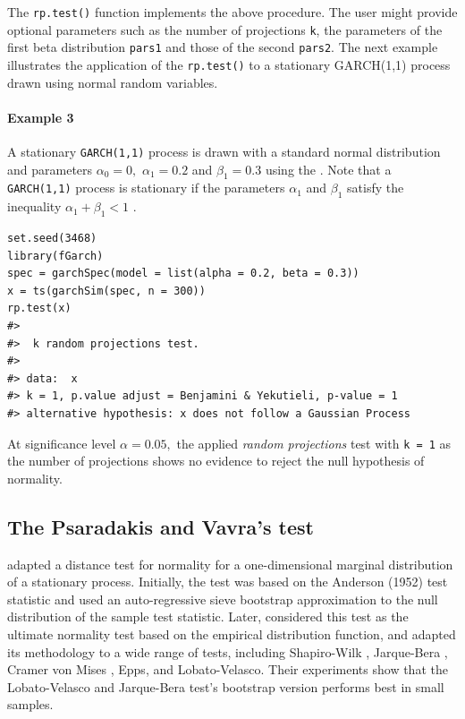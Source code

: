 The \texttt{rp.test()} function implements the above procedure. The user might provide optional parameters such as the number of projections \texttt{k}, the parameters of the first beta distribution \texttt{pars1} and those of the second \texttt{pars2}. The next example illustrates the application of the \texttt{rp.test()} to a stationary GARCH(1,1) process drawn using normal random variables.

\paragraph{Example 3}\label{example-3}

A stationary \texttt{GARCH(1,1)} process is drawn with a standard normal distribution and parameters \(\alpha_0 = 0,\) \(\alpha_1 = 0.2\) and \(\beta_1 = 0.3\) using the \citep[ package,][]{fGarch}. Note that a \texttt{GARCH(1,1)} process is stationary if the parameters \(\alpha_1\) and \(\beta_1\) satisfy the inequality \(\alpha_1 + \beta_1 < 1\) \citep{Bollerslev1986}.

\begin{verbatim}
set.seed(3468)
library(fGarch)
spec = garchSpec(model = list(alpha = 0.2, beta = 0.3))
x = ts(garchSim(spec, n = 300))
rp.test(x) 
#> 
#>  k random projections test.
#> 
#> data:  x
#> k = 1, p.value adjust = Benjamini & Yekutieli, p-value = 1
#> alternative hypothesis: x does not follow a Gaussian Process
\end{verbatim}

At significance level \(\alpha = 0.05,\) the applied \emph{random projections} test with \texttt{k\ =\ 1} as the number of projections shows no evidence to reject the null hypothesis of normality.

\subsection{The Psaradakis and Vavra's test}\label{the-psaradakis-and-vavras-test}

\citet{vavra2017} adapted a distance test for normality for a one-dimensional marginal distribution of a stationary process. Initially, the test was based on the Anderson (1952) test statistic and used an auto-regressive sieve bootstrap approximation to the null distribution of the sample test statistic. Later, \citet{psaradakis2020normality} considered this test as the ultimate normality test based on the empirical distribution function, and adapted its methodology to a wide range of tests, including Shapiro-Wilk \citep{SWtest1965}, Jarque-Bera \citep{jarque1980}, Cramer von Mises \citep{vonMisses1962}, Epps, and Lobato-Velasco. Their experiments show that the Lobato-Velasco and Jarque-Bera test's bootstrap version performs best in small samples.

